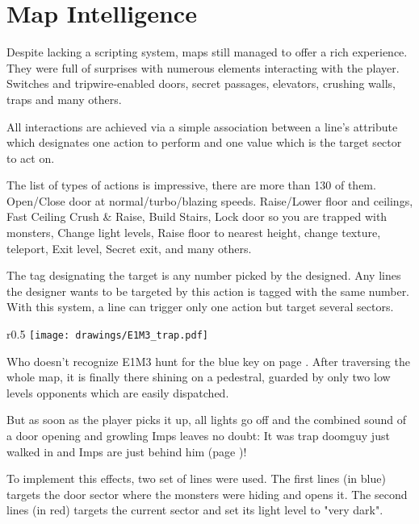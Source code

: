 \section{Map Intelligence}
Despite lacking a scripting system, maps still managed to offer a rich experience. They were full of surprises with numerous elements interacting with the player. Switches and tripwire-enabled doors, secret passages, elevators, crushing walls, traps and many others.\\
\par
{}
\par
All interactions are achieved via a simple association between a line's  attribute which designates one action to perform and one  value which is the target sector to act on.\\
\par
The list of types of actions is impressive, there are more than 130 of them. Open/Close door at normal/turbo/blazing speeds. Raise/Lower floor and ceilings, Fast Ceiling Crush \& Raise, Build Stairs, Lock door so you are trapped with monsters, Change light levels, Raise floor to nearest height, change texture, teleport, Exit level, Secret exit, and many others.\\
\par
The tag designating the target is any number picked by the designed. Any lines the designer wants to be targeted by this action is tagged with the same number. With this system, a line can trigger only one action but target several sectors.\\
\par
{}
\pagebreak






\begin{wrapfigure}[17]{r}{0.5\textwidth}
\centering
\texttt{[image: drawings/E1M3\_trap.pdf]}
\end{wrapfigure}
Who doesn't recognize E1M3 hunt for the blue key on page \pageref{e1m3_trap}. After traversing the whole map, it is finally there shining on a pedestral, guarded by only two low levels opponents which are easily dispatched.\\
\par
But as soon as the player picks it up, all lights go off and the combined sound of a door opening and growling Imps leaves no doubt: It was trap doomguy just walked in and Imps are just behind him (page \pageref{e1m3_trap})!\\
\par
To implement this effects, two set of lines were used. The first lines (in blue) targets the door sector where the monsters were hiding and opens it. The second lines (in red) targets the current sector and set its light level to "very dark".\\
\par



